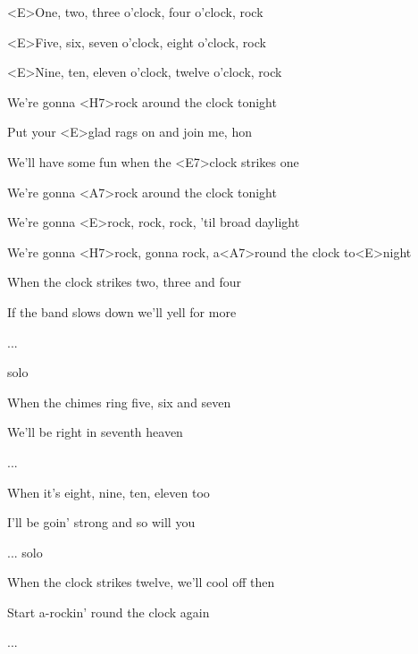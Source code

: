 

\zs 
<E>One, two, three o'clock, four o'clock, rock

<E>Five, six, seven o'clock, eight o'clock, rock

<E>Nine, ten, eleven o'clock, twelve o'clock, rock

We're gonna <H7>rock around the clock tonight
\ks

\zs

Put your <E>glad rags on and join me, hon

We'll have some fun when the <E7>clock strikes one

We're gonna <A7>rock around the clock tonight

We're gonna <E>rock, rock, rock, 'til broad daylight

We're gonna <H7>rock, gonna rock, a<A7>round the clock to<E>night
\ks

\zs
When the clock strikes two, three and four

If the band slows down we'll yell for more

...
\ks

\zs
solo
\ks

\zs
When the chimes ring five, six and seven

We'll be right in seventh heaven

...
\ks

\zs
When it's eight, nine, ten, eleven too

I'll be goin' strong and so will you

...
\ks
\zs
solo
\ks

\zs
When the clock strikes twelve, we'll cool off then

Start a-rockin' round the clock again

...
\ks

\kp
